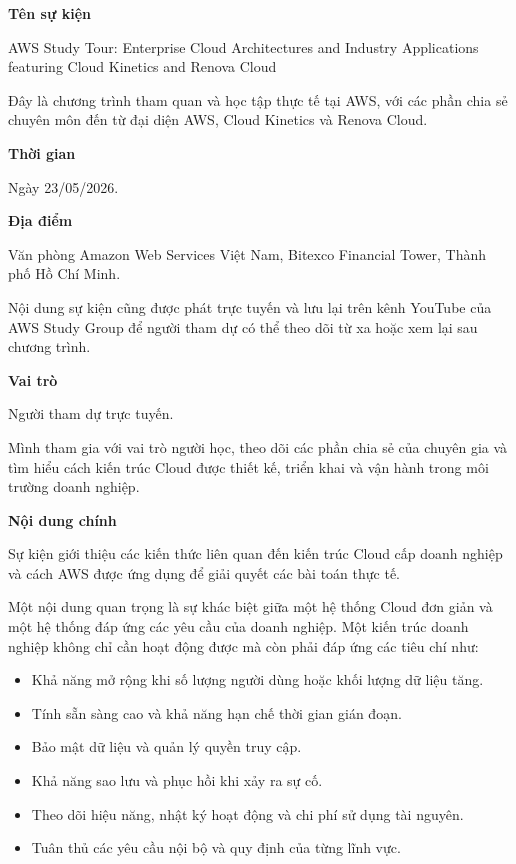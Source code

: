 \vspace{0.5em}\noindent\textbf{Tên sự kiện}\par

AWS Study Tour: Enterprise Cloud Architectures and Industry Applications
featuring Cloud Kinetics and Renova Cloud

Đây là chương trình tham quan và học tập thực tế tại AWS, với các phần
chia sẻ chuyên môn đến từ đại diện AWS, Cloud Kinetics và Renova Cloud.

\vspace{0.5em}\noindent\textbf{Thời gian}\par

Ngày 23/05/2026.

\vspace{0.5em}\noindent\textbf{Địa điểm}\par

Văn phòng Amazon Web Services Việt Nam, Bitexco Financial Tower, Thành
phố Hồ Chí Minh.

Nội dung sự kiện cũng được phát trực tuyến và lưu lại trên kênh YouTube
của AWS Study Group để người tham dự có thể theo dõi từ xa hoặc xem lại
sau chương trình.

\vspace{0.5em}\noindent\textbf{Vai trò}\par

Người tham dự trực tuyến.

Mình tham gia với vai trò người học, theo dõi các phần chia sẻ của
chuyên gia và tìm hiểu cách kiến trúc Cloud được thiết kế, triển khai và
vận hành trong môi trường doanh nghiệp.

\vspace{0.5em}\noindent\textbf{Nội dung chính}\par

Sự kiện giới thiệu các kiến thức liên quan đến kiến trúc Cloud cấp doanh
nghiệp và cách AWS được ứng dụng để giải quyết các bài toán thực tế.

Một nội dung quan trọng là sự khác biệt giữa một hệ thống Cloud đơn giản
và một hệ thống đáp ứng các yêu cầu của doanh nghiệp. Một kiến trúc
doanh nghiệp không chỉ cần hoạt động được mà còn phải đáp ứng các tiêu
chí như:

\begin{itemize}
\tightlist
\item
  Khả năng mở rộng khi số lượng người dùng hoặc khối lượng dữ liệu tăng.
\item
  Tính sẵn sàng cao và khả năng hạn chế thời gian gián đoạn.
\item
  Bảo mật dữ liệu và quản lý quyền truy cập.
\item
  Khả năng sao lưu và phục hồi khi xảy ra sự cố.
\item
  Theo dõi hiệu năng, nhật ký hoạt động và chi phí sử dụng tài nguyên.
\item
  Tuân thủ các yêu cầu nội bộ và quy định của từng lĩnh vực.
\end{itemize}

